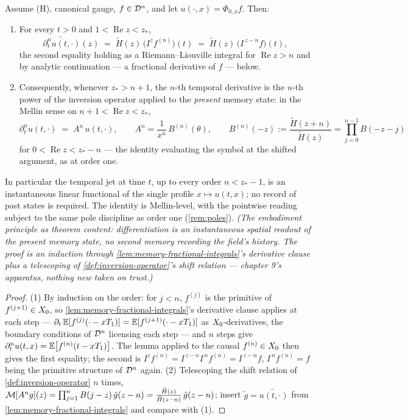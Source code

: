 \begin{theorem}\label{thm:embodied-jet}
Assume (H), canonical gauge, $f \in \mathcal{D}^n$, and let $u(\cdot, x) = \Phi_{0,x}f$. Then:
\begin{enumerate}
\item For every $t > 0$ and $1 < \operatorname{Re} z < z_*$,
\[
  \widetilde{\partial_t^n u(t, \cdot)}(z) \;=\; \tilde H(z)\,\bigl(I^{z} f^{(n)}\bigr)(t)
  \;=\; \tilde H(z)\,\bigl(I^{\,z - n} f\bigr)(t),
\]
the second equality holding as a Riemann--Liouville integral for $\operatorname{Re} z > n$ and
by analytic continuation --- a fractional derivative of $f$ --- below.
\item Consequently, whenever $z_* > n + 1$, the $n$-th temporal derivative is the $n$-th power
of the inversion operator applied to the \emph{present} memory state: in the Mellin sense on
$n + 1 < \operatorname{Re} z < z_*$,
\[
  \partial_t^n u(t, \cdot) \;=\; A^n\, u(t, \cdot), \qquad
  A^n = \frac{1}{x^n}\,B^{(n)}(\theta), \qquad
  B^{(n)}(-z) := \frac{\tilde H(z + n)}{\tilde H(z)} = \prod_{j=0}^{n-1} B(-z - j)
\]
for $0 < \operatorname{Re} z < z_* - n$ --- the identity evaluating the symbol at the shifted
argument, as at order one.
\end{enumerate}
In particular the temporal jet at time $t$, up to every order $n < z_* - 1$, is an
instantaneous linear functional of the single profile $x \mapsto u(t, x)$; no record of past
states is required. The identity is Mellin-level, with the pointwise reading subject to the
same pole discipline as order one (\ref{rem:poles}).
\statusT\quad\emph{(The embodiment principle as theorem content: differentiation is an
instantaneous spatial readout of the present memory state, no second memory recording the
field's history. The proof is an induction through \ref{lem:memory-fractional-integrals}'s
derivative clause plus a telescoping of \ref{def:inversion-operator}'s shift relation ---
chapter 9's apparatus, nothing new taken on trust.)}
\end{theorem}

\begin{proof}
(1) By induction on the order: for $j < n$, $f^{(j)}$ is the primitive of
$f^{(j+1)} \in X_0$, so \ref{lem:memory-fractional-integrals}'s derivative clause
applies at each step --- $\partial_t\,\mathbb{E}[f^{(j)}(\cdot - xT_1)] = \mathbb{E}[f^{(j+1)}(\cdot - xT_1)]$
as $X_0$-derivatives, the boundary conditions of $\mathcal{D}^n$ licensing each step --- and $n$
steps give $\partial_t^n u(t, x) = \mathbb{E}\bigl[f^{(n)}(t - x T_1)\bigr]$. The lemma applied to
the causal $f^{(n)} \in X_0$ then gives the
first equality; the second is $I^{z} f^{(n)} = I^{\,z-n} I^{\,n} f^{(n)} = I^{\,z-n} f$,
$I^{\,n}f^{(n)} = f$ being the primitive structure of $\mathcal{D}^n$ again. (2) Telescoping the shift relation of
\ref{def:inversion-operator} $n$ times,
$\mathcal{M}[A^n g](z) = \prod_{j=1}^{n} B(j - z)\,\tilde g(z - n)
= \tfrac{\tilde H(z)}{\tilde H(z - n)}\,\tilde g(z - n)$; insert
$\tilde g = \widetilde{u(t,\cdot)}$ from \ref{lem:memory-fractional-integrals} and
compare with (1).
\end{proof}

